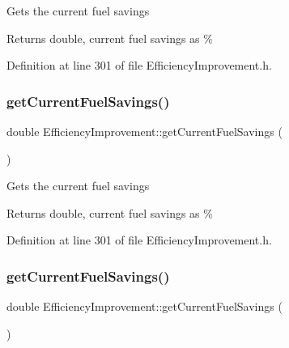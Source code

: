 Gets the current fuel savings

\begin{DoxyReturn}{Returns}
double, current fuel savings as \% 
\end{DoxyReturn}


Definition at line 301 of file Efficiency\+Improvement.\+h.

\mbox{\label{class_efficiency_improvement_ab2e940be7192df960c9eb9578096796f}} 
\subsubsection{\texorpdfstring{get\+Current\+Fuel\+Savings()}{getCurrentFuelSavings()}\hspace{0.1cm}{\footnotesize\ttfamily [2/3]}}
{\footnotesize\ttfamily double Efficiency\+Improvement\+::get\+Current\+Fuel\+Savings (\begin{DoxyParamCaption}{ }\end{DoxyParamCaption})\hspace{0.3cm}{\ttfamily [inline]}}

Gets the current fuel savings

\begin{DoxyReturn}{Returns}
double, current fuel savings as \% 
\end{DoxyReturn}


Definition at line 301 of file Efficiency\+Improvement.\+h.

\mbox{\label{class_efficiency_improvement_ab2e940be7192df960c9eb9578096796f}} 
\subsubsection{\texorpdfstring{get\+Current\+Fuel\+Savings()}{getCurrentFuelSavings()}\hspace{0.1cm}{\footnotesize\ttfamily [3/3]}}
{\footnotesize\ttfamily double Efficiency\+Improvement\+::get\+Current\+Fuel\+Savings (\begin{DoxyParamCaption}{ }\end{DoxyParamCaption})\hspace{0.3cm}{\ttfamily [inline]}}

